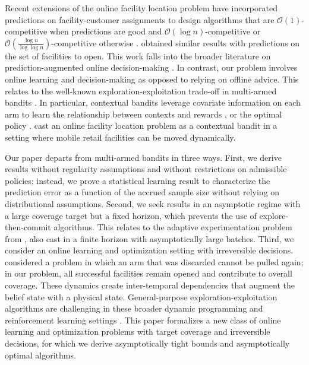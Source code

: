 \documentclass[nonblindrev]{informs3noheader}
\def\calO{\mathcal{O}}
\begin{document}
Recent extensions of the online facility location problem have incorporated predictions on facility-customer assignments to design algorithms that are $\calO(1)$-competitive when predictions are good and $\calO(\log n)$-competitive or $\calO\left(\frac{\log n}{\log\log n}\right)$-competitive otherwise \citep{jiang2021online,fotakis2021learning}. \cite{almanza2021online} obtained similar results with predictions on the set of facilities to open. This work falls into the broader literature on prediction-augmented online decision-making \citep[e.g.,][]{lavastida2020learnable,lykouris2021competitive}. In contrast, our problem involves online learning and decision-making as opposed to relying on offline advice. This relates to the well-known exploration-exploitation trade-off in multi-armed bandits \citep{slivkins2019introduction}. In particular, contextual bandits leverage covariate information on each arm to learn the relationship between contexts and rewards \citep{lu2010contextual,slivkins2011contextual,chu2011contextual}, or the optimal policy \citep{auer2002nonstochastic,langford2007epoch}. \cite{cao2021online} cast an online facility location problem as a contextual bandit in a setting where mobile retail facilities can be moved dynamically.

Our paper departs from multi-armed bandits in three ways. First, we derive results without regularity assumptions and without restrictions on admissible policies; instead, we prove a statistical learning result to characterize the prediction error as a function of the accrued sample size without relying on distributional assumptions. Second, we seek results in an asymptotic regime with a large coverage target but a fixed horizon, which prevents the use of explore-then-commit algorithms. This relates to the adaptive experimentation problem from \cite{che2023adaptive}, also cast in a finite horizon with asymptotically large batches. Third, we consider an online learning and optimization setting with irreversible decisions. \cite{farias2011irrevocable} considered a problem in which an arm that was discarded cannot be pulled again; in our problem, all successful facilities remain opened and contribute to overall coverage. These dynamics create inter-temporal dependencies that augment the belief state with a physical state. General-purpose exploration-exploitation algorithms are challenging in these broader dynamic programming and reinforcement learning settings \citep{ryzhov2012knowledge,russo2018learning,osband2019deep}. This paper formalizes a new class of online learning and optimization problems with target coverage and irreversible decisions, for which we derive asymptotically tight bounds and asymptotically optimal algorithms.
\end{document}
